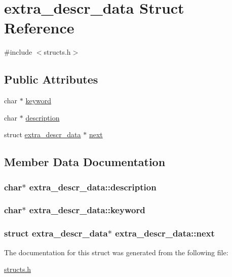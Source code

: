 \hypertarget{structextra__descr__data}{\section{extra\-\_\-descr\-\_\-data Struct Reference}
\label{structextra__descr__data}
}


{\ttfamily \#include $<$structs.\-h$>$}

\subsection*{Public Attributes}
\begin{DoxyCompactItemize}
\item 
char $\ast$ \hyperlink{structextra__descr__data_a0173f2f9f733957566645b4a5b5b4d1e}{keyword}
\item 
char $\ast$ \hyperlink{structextra__descr__data_a13f183c6a3726eb38afd80e8e2d0cf84}{description}
\item 
struct \hyperlink{structextra__descr__data}{extra\-\_\-descr\-\_\-data} $\ast$ \hyperlink{structextra__descr__data_a977c267a37176ab1befd09d25f6c7a06}{next}
\end{DoxyCompactItemize}


\subsection{Member Data Documentation}
\hypertarget{structextra__descr__data_a13f183c6a3726eb38afd80e8e2d0cf84}{
\subsubsection[{description}]{\setlength{\rightskip}{0pt plus 5cm}char$\ast$ extra\-\_\-descr\-\_\-data\-::description}}\label{structextra__descr__data_a13f183c6a3726eb38afd80e8e2d0cf84}
\hypertarget{structextra__descr__data_a0173f2f9f733957566645b4a5b5b4d1e}{
\subsubsection[{keyword}]{\setlength{\rightskip}{0pt plus 5cm}char$\ast$ extra\-\_\-descr\-\_\-data\-::keyword}}\label{structextra__descr__data_a0173f2f9f733957566645b4a5b5b4d1e}
\hypertarget{structextra__descr__data_a977c267a37176ab1befd09d25f6c7a06}{
\subsubsection[{next}]{\setlength{\rightskip}{0pt plus 5cm}struct {\bf extra\-\_\-descr\-\_\-data}$\ast$ extra\-\_\-descr\-\_\-data\-::next}}\label{structextra__descr__data_a977c267a37176ab1befd09d25f6c7a06}


The documentation for this struct was generated from the following file\-:\begin{DoxyCompactItemize}
\item 
\hyperlink{structs_8h}{structs.\-h}\end{DoxyCompactItemize}
